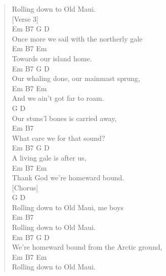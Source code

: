 \documentclass[11pt]{article}
\begin{document}
\begin{verse}
Rolling down to Old Maui.\\
\vspace*{1em}
[Verse 3]\\
\hspace*{5em}Em      B7            G         D\\
Once more we sail with the northerly gale\\
\hspace*{2em}Em        B7     Em\\
Towards our island home.\\
\hspace*{4em}Em      B7        G        D\\
Our whaling done, our mainmast sprung,\\
\hspace*{7em}Em        B7     Em\\
And we ain't got far to roam.\\
\hspace*{4em}G                    D\\
Our stuns'l bones is carried away,\\
\hspace*{5em}Em               B7\\
What care we for that sound?\\
\hspace*{3em}Em    B7      G      D\\
A living gale is after us,\\
\hspace*{6em}Em        B7       Em\\
Thank God we're homeward bound.\\
\vspace*{1em}
[Chorus]\\
\hspace*{8em}G             D\\
Rolling down to Old Maui, me boys\\
\hspace*{8em}Em            B7\\
Rolling down to Old Maui.\\
\hspace*{6em}Em       B7             G      D\\
We're homeward bound from the Arctic ground,\\
\hspace*{8em}Em      B7    Em\\
Rolling down to Old Maui.\\
\vspace*{1em}

\end{verse}
\end{document}
